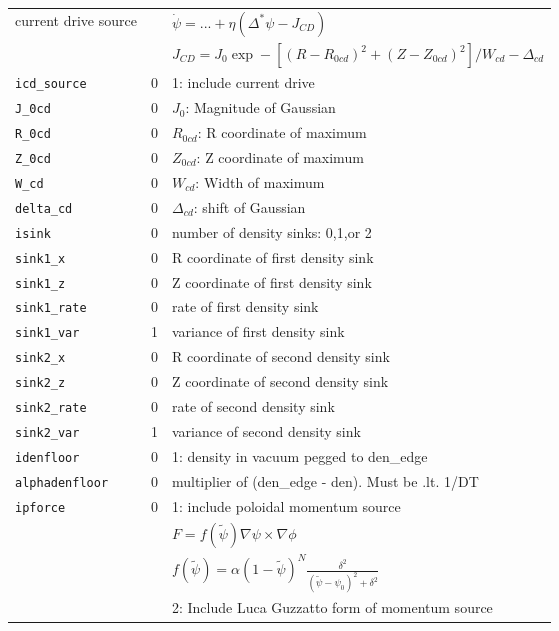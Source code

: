 \begin{tabular}{llp{4.5in}}
  \hline
current drive source & & $\dot{\psi} = ... + \eta(\Delta^* \psi - J_{CD}) $ \\
                     & & $J_{CD} = J_0 \exp- \left[ (R-R_{0cd})^2 + (Z-Z_{0cd})^2   
                                             \right]/W_{cd} - \Delta_{cd}  $ \\
 \texttt{icd\_source} & 0 & 1: include current drive \\
 \texttt{J\_0cd}      & 0 & $J_0$: Magnitude of Gaussian \\
 \texttt{R\_0cd}      & 0 & $R_{0cd}$: R coordinate of maximum \\
 \texttt{Z\_0cd}      & 0 & $Z_{0cd}$: Z coordinate of maximum \\
 \texttt{W\_cd}       & 0 & $W_{cd}$: Width of maximum \\
 \texttt{delta\_cd}   & 0 & $\Delta_{cd}$: shift of Gaussian \\
\hline
 \texttt{isink}          & 0 & number of density sinks: 0,1,or 2 \\
 \texttt{sink1\_x}       & 0 & R coordinate of first density sink \\
 \texttt{sink1\_z}       & 0 & Z coordinate of first density sink \\
 \texttt{sink1\_rate}    & 0 & rate of first density sink \\
 \texttt{sink1\_var}     & 1 & variance of first density sink \\
 \texttt{sink2\_x}       & 0 & R coordinate of second density sink \\
 \texttt{sink2\_z}       & 0 & Z coordinate of second density sink \\
 \texttt{sink2\_rate}    & 0 & rate of second density sink \\
 \texttt{sink2\_var}     & 1 & variance of second density sink \\
\hline
 \texttt{idenfloor}      & 0 & 1: density in vacuum pegged to den\_edge \\
 \texttt{alphadenfloor}  & 0 & multiplier of (den\_edge - den).  Must be .lt. 1/DT \\ 
\hline
 \texttt{ipforce} & 0 & 1: include poloidal momentum source \\
                  &   & $F = f(\tilde{\psi}) \nabla \psi \times \nabla \phi$  \\
                  &   & $f(\tilde{\psi}) = \alpha(1 - \tilde{\psi})^N \frac{ \delta^2    }
                                                                           { (\tilde{\psi} - \psi_0)^2    + \delta^2} $  \\
                  &   & 2:  Include Luca Guzzatto form of momentum source  


\end{tabular}

